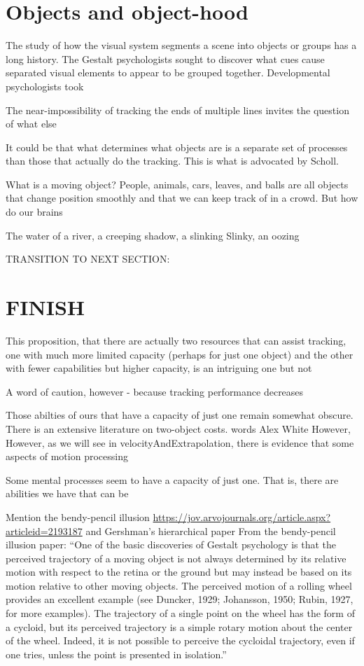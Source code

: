 \documentclass[]{book}
\begin{document}
\hypertarget{objects-and-object-hood}{%
\section{Objects and object-hood}\label{objects-and-object-hood}}

The study of how the visual system segments a scene into objects or groups has a long history. The Gestalt psychologists sought to discover what cues cause separated visual elements to appear to be grouped together. Developmental psychologists took

The near-impossibility of tracking the ends of multiple lines invites the question of what else

It could be that what determines what objects are is a separate set of processes than those that actually do the tracking. This is what is advocated by Scholl.

What is a moving object? People, animals, cars, leaves, and balls are all objects that change position smoothly and that we can keep track of in a crowd. But how do our brains

The water of a river, a creeping shadow, a slinking Slinky, an oozing

TRANSITION TO NEXT SECTION:

\hypertarget{finish}{%
\section{FINISH}\label{finish}}

This proposition, that there are actually two resources that can assist tracking, one with much more limited capacity (perhaps for just one object) and the other with fewer capabilities but higher capacity, is an intriguing one but not

A word of caution, however - because tracking performance decreases

Those abilties of ours that have a capacity of just one remain somewhat obscure. There is an extensive literature on two-object costs. words Alex White However,
However, as we will see in velocityAndExtrapolation, there is evidence that some aspects of motion processing

Some mental processes seem to have a capacity of just one. That is, there are abilities we have that can be

Mention the bendy-pencil illusion \url{https://jov.arvojournals.org/article.aspx?articleid=2193187} and Gershman's hierarchical paper
From the bendy-pencil illusion paper: ``One of the basic discoveries of Gestalt psychology is that the perceived trajectory of a moving object is not always determined by its relative motion with respect to the retina or the ground but may instead be based on its motion relative to other moving objects. The perceived motion of a rolling wheel provides an excellent example (see Duncker, 1929; Johansson, 1950; Rubin, 1927, for more examples). The trajectory of a single point on the wheel has the form of a cycloid, but its perceived trajectory is a simple rotary motion about the center of the wheel. Indeed, it is not possible to perceive the cycloidal trajectory, even if one tries, unless the point is presented in isolation.''
\end{document}
